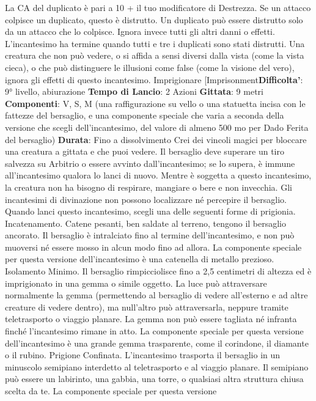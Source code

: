 \begin{multicols}{2}
La CA del duplicato è pari a 10 + il tuo modificatore di
Destrezza. Se un attacco colpisce un duplicato, questo
è distrutto. Un duplicato può essere distrutto solo da un
attacco che lo colpisce. Ignora invece tutti gli altri danni
o effetti. L’incantesimo ha termine quando tutti e tre i
duplicati sono stati distrutti.
Una creatura che non può vedere, o si affida a sensi
diversi dalla vista (come la vista cieca), o che può 
distinguere le illusioni come false (come la visione del
vero), ignora gli effetti di questo incantesimo.
Imprigionare
[Imprisonment\textbf{Difficolta'}:
9° livello, abiurazione
\textbf{Tempo di Lancio}: 2 Azioni
\textbf{Gittata}: 9 metri
\textbf{Componenti}: V, S, M (una raffigurazione su vello o una
statuetta incisa con le fattezze del bersaglio, e una
componente speciale che varia a seconda della
versione che scegli dell’incantesimo, del valore di
almeno 500 mo per Dado Ferita del bersaglio)
\textbf{Durata}: Fino a dissolvimento
Crei dei vincoli magici per bloccare una creatura a
gittata e che puoi vedere. Il bersaglio deve superare un
tiro salvezza su Arbitrio o essere avvinto
dall’incantesimo; se lo supera, è immune
all’incantesimo qualora lo lanci di nuovo. Mentre è
soggetta a questo incantesimo, la creatura non ha
bisogno di respirare, mangiare o bere e non invecchia.
Gli incantesimi di divinazione non possono localizzare
né percepire il bersaglio.
Quando lanci questo incantesimo, scegli una delle
seguenti forme di prigionia.
Incatenamento. Catene pesanti, ben saldate al
terreno, tengono il bersaglio ancorato. Il bersaglio è
intralciato fino al termine dell’incantesimo, e non può
muoversi né essere mosso in alcun modo fino ad allora.
La componente speciale per questa versione
dell’incantesimo è una catenella di metallo prezioso.
Isolamento Minimo. Il bersaglio rimpicciolisce fino a
2,5 centimetri di altezza ed è imprigionato in una
gemma o simile oggetto. La luce può attraversare
normalmente la gemma (permettendo al bersaglio di
vedere all’esterno e ad altre creature di vedere dentro),
ma null’altro può attraversarla, neppure tramite
teletrasporto o viaggio planare. La gemma non può
essere tagliata né infranta finché l’incantesimo rimane
in atto.
La componente speciale per questa versione
dell’incantesimo è una grande gemma trasparente,
come il corindone, il diamante o il rubino.
Prigione Confinata. L’incantesimo trasporta il
bersaglio in un minuscolo semipiano interdetto al
teletrasporto e al viaggio planare. Il semipiano può
essere un labirinto, una gabbia, una torre, o qualsiasi
altra struttura chiusa scelta da te.
La componente speciale per questa versione

\end{multicols}
